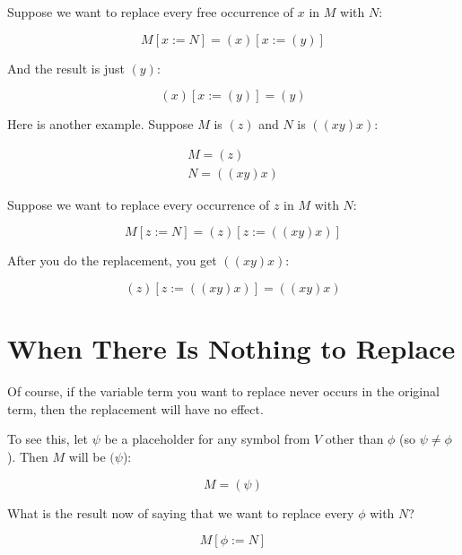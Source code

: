\documentclass{book}
\numberwithin{equation}{chapter}
\begin{document}
\noindent
Suppose we want to replace every free occurrence of $x$ in $M$ with $N$:

\begin{equation}
M[x := N] = (x)[x := (y)]
\end{equation}

\noindent
And the result is just $(y)$:

\begin{equation}
(x)[x := (y)] = (y)
\end{equation}

\noindent
Here is another example. Suppose $M$ is $(z)$ and $N$ is $((x y) x)$:

\begin{align}
M = (z) \\
N = ((x y) x)
\end{align}

\noindent
Suppose we want to replace every occurrence of $z$ in $M$ with $N$:

\begin{equation}
M[z := N] = (z)[z := ((x y) x)]
\end{equation}

\noindent
After you do the replacement, you get $((x y) x)$:

\begin{equation}
(z)[z := ((x y) x)] = ((x y) x)
\end{equation}


\section{When There Is Nothing to Replace}

Of course, if the variable term you want to replace never occurs in the original term, then the replacement will have no effect. 

To see this, let $\psi$ be a placeholder for any symbol from $V$ other than $\phi$ (so $\psi \not = \phi$). Then $M$ will be $(\psi$):

\begin{equation}
M = (\psi)
\end{equation}

\noindent
What is the result now of saying that we want to replace every $\phi$ with $N$?

\begin{equation}
M[\phi := N]
\end{equation}
\end{document}

